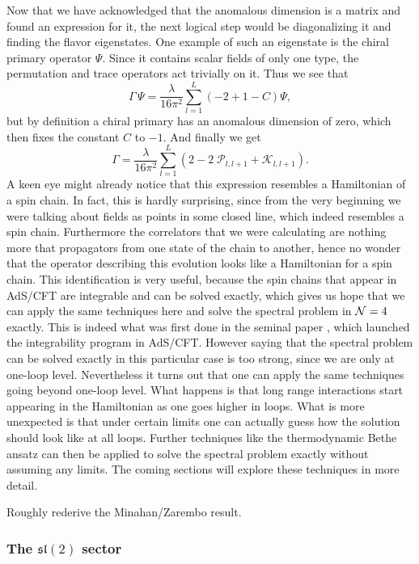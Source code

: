 Now that we have acknowledged that the anomalous dimension is a matrix and found an expression for it, the next logical step would be diagonalizing it and finding the flavor eigenstates. One example of such an eigenstate is the chiral primary operator $\Psi$. Since it contains scalar fields of only one type, the permutation and trace operators act trivially on it. Thus we see that
\begin{equation}
	\Gamma \, \Psi = \frac{\lambda}{16\pi^2}\sum_{l=1}^L \left( -2 + 1 - C \right) \Psi,
\end{equation}
but by definition a chiral primary has an anomalous dimension of zero, which then fixes the constant $C$ to $-1$. And finally we get
\begin{equation}
	\Gamma = \frac{\lambda}{16\pi^2}\sum_{l=1}^L \left(2 - 2 \; \mathcal{P}_{l,l+1} + \mathcal{K}_{l,l+1} \right).
\end{equation}
A keen eye might already notice that this expression resembles a Hamiltonian of a spin chain. In fact, this is hardly surprising, since from the very beginning we were talking about fields as points in some closed line, which indeed resembles a spin chain. Furthermore the correlators that we were calculating are nothing more that propagators from one state of the chain to another, hence no wonder that the operator describing this evolution looks like a Hamiltonian for a spin chain. This identification is very useful, because the spin chains that appear in AdS/CFT are integrable and can be solved exactly, which gives us hope that we can apply the same techniques here and solve the spectral problem in $\mathcal{N}=4$ exactly. This is indeed what was first done in the seminal paper \cite{minahan_original}, which launched the integrability program in AdS/CFT. However saying that the spectral problem can be solved exactly in this particular case is too strong, since we are only at one-loop level. Nevertheless it turns out that one can apply the same techniques going beyond one-loop level. What happens is that long range interactions start appearing in the Hamiltonian as one goes higher in loops. What is more unexpected is that under certain limits one can actually guess how the solution should look like at all loops. Further techniques like the thermodynamic Bethe ansatz can then be applied to solve the spectral problem exactly without assuming any limits. The coming sections will explore these techniques in more detail.

Roughly rederive the Minahan/Zarembo result.

\subsubsection{The $\mathfrak{sl}(2)$ sector}


